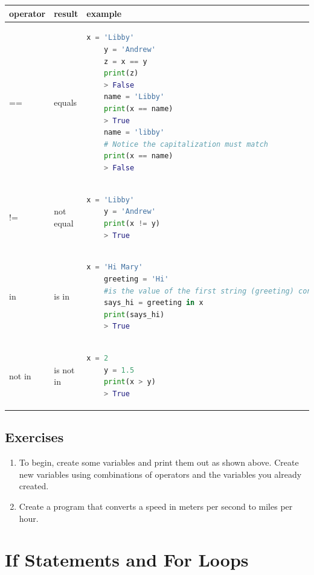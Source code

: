 \documentclass[]{article}
\begin{document}
\begin{center}
\begin{tabular}{ | m{5em}| m{7em} | m{20em} | } 
\hline
\textbf{operator} & \textbf{result} & \textbf{example} \\ 
\hline
== & equals & \begin{lstlisting}[language=python]
    x = 'Libby'
    y = 'Andrew'
    z = x == y
    print(z)
    > False
    name = 'Libby'
    print(x == name)
    > True
    name = 'libby'
    # Notice the capitalization must match
    print(x == name)
    > False
\end{lstlisting} \\ 

 != & not equal & \begin{lstlisting}[language=python]
    x = 'Libby'
    y = 'Andrew'
    print(x != y)
    > True
\end{lstlisting} \\ 
\hline

\hline
in & is in & \begin{lstlisting}[language=python]
    x = 'Hi Mary'
    greeting = 'Hi'
    #is the value of the first string (greeting) contained in the value of the second string (x)
    says_hi = greeting in x
    print(says_hi)
    > True
\end{lstlisting} \\ 
\hline
not in & is not in & \begin{lstlisting}[language=python]
    x = 2
    y = 1.5
    print(x > y)
    > True
\end{lstlisting} \\ 
\hline


\end{tabular}
\end{center}

\subsection{Exercises}

\begin{enumerate}
    \item To begin, create some variables and print them out as shown above.  Create new variables using combinations of operators  and the variables you already created.  
    \item Create a program that converts a speed in meters per second to miles per hour.
\end{enumerate}

\section{ If Statements and For Loops}
\end{document}

